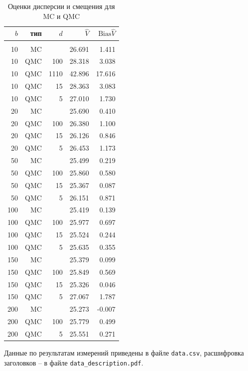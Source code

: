 \documentclass{article}
\newcommand{\Vhat}{\hat{V}}
\begin{document}
\begin{table}[hp]
\centering
\caption{Оценки дисперсии и смещения для MC и QMC}\label{tbl:mc_qmc}
\vspace{10pt}
\begin{tabular}{rrrrr}
$b$&тип&$d$&$\Vhat$&$\mathrm{Bias}\Vhat$\\[5pt]\hline\\
10&MC&&26.691&1.411\\
10&QMC&100&28.318&3.038\\
10&QMC&1110&42.896&17.616\\
10&QMC&15&28.363&3.083\\
10&QMC&5&27.010&1.730\\[5pt]
20&MC&&25.690&0.410\\
20&QMC&100&26.380&1.100\\
20&QMC&15&26.126&0.846\\
20&QMC&5&26.453&1.173\\[5pt]
50&MC&&25.499&0.219\\
50&QMC&100&25.860&0.580\\
50&QMC&15&25.367&0.087\\
50&QMC&5&26.151&0.871\\[5pt]
100&MC&&25.419&0.139\\
100&QMC&100&25.977&0.697\\
100&QMC&15&25.524&0.244\\
100&QMC&5&25.635&0.355\\[5pt]
150&MC&&25.379&0.099\\
150&QMC&100&25.849&0.569\\
150&QMC&15&25.326&0.046\\
150&QMC&5&27.067&1.787\\[5pt]
200&MC&&25.273&-0.007\\
200&QMC&100&25.779&0.499\\
200&QMC&5&25.551&0.271\\[5pt]
\end{tabular}
\end{table}

Данные по результатам измерений приведены в файле \texttt{data.csv}, расшифровка заголовков -- в файле \texttt{data\_description.pdf}.
\end{document}
